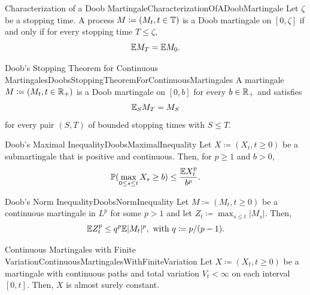 \begin{thm}{Characterization of a Doob Martingale}{CharacterizationOfADoobMartingale}
	Let $\zeta$ be a stopping time. A process $M \coloneqq (M_t, t \in \mathbb{T})$ is a Doob martingale on $[0, \zeta]$ if and only if for every stopping time $T \le \zeta$,
	\begin{equation}\label{eq:DoobMartingaleExpectation}
		\mathbb{E} M_T = \mathbb{E} M_0.
	\end{equation}
\end{thm}

\begin{thm}{Doob's Stopping Theorem for Continuous Martingales}{DoobsStoppingTheoremForContinuousMartingales}
	A martingale $M \coloneqq (M_t, t \in \mathbb{R}_+)$ is a Doob martingale on $[0, b]$ for every $b \in \mathbb{R}_+$ and satisfies
	\begin{equation}\label{eq:DoobStoppingContinuous}
		\mathbb{E}_S M_T = M_S
	\end{equation}
	for every pair $(S, T)$ of bounded stopping times with $S \le T$.
\end{thm}

\begin{prop}{Doob's Maximal Inequality}{DoobsMaximalInequality}
	Let $X \coloneqq (X_t, t \ge 0)$ be a submartingale that is positive and continuous. Then, for $p \ge 1$ and $b > 0$,
	\begin{equation}\label{eq:DoobsMaximalInequality}
		\mathbb{P}(\max_{0 \le s \le t} X_s \ge b) \le \frac{\mathbb{E} X_t^p}{b^p}.
	\end{equation}
\end{prop}

\begin{prop}{Doob's Norm Inequality}{DoobsNormInequality}
	Let $M \coloneqq (M_t, t \ge 0)$ be a continuous martingale in $L^p$ for some $p > 1$ and let $Z_t \coloneqq \max_{s \le t} |M_s|$. Then,
	\begin{equation}\label{eq:DoobsNormInequality}
		\mathbb{E} Z_t^p \le q^p \mathbb{E} |M_t|^p, \text{ with } q \coloneqq p/(p-1).
	\end{equation}
\end{prop}

\begin{lem}{Continuous Martingales with Finite Variation}{ContinuousMartingalesWithFiniteVariation}
	Let $X \coloneqq (X_t, t \ge 0)$ be a martingale with continuous paths and total variation $V_t < \infty$ on each interval $[0, t]$. Then, $X$ is almost surely constant.
\end{lem}

